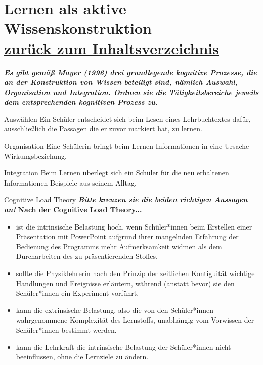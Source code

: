 \documentclass[a4paper]{article}
\newcommand{\ACorrectAnswer}{\rlap{$\square$}{\raisebox{2pt}{\large\hspace{1pt}\ding{51}}}\hspace{-2.5pt}}
\newcommand{\AWrongAnswer}{\rlap{$\square$}{\large\hspace{1pt}\ding{55}}}
\newcommand{\AnUnsureAnswer}{\rlap{$\square$}{\large\hspace{1pt}\textbf?}}
\newcommand{\defaultCorrect}{\ding{51}}
\newcommand{\defaultWrong}{\ding{55}}
\newcommand{\defaultUnsure}{\textbf{?}}
\newenvironment{answers}{\begin{itemize}}{\end{itemize}}
\newcommand{\correct}{\defaultCorrect}
\newcommand{\wrong}{\defaultWrong}
\newcommand{\unsure}{\defaultUnsure}
\newenvironment{question}[2]{%
    \section[#1 \normalfont(#2)]{#1\\\small\normalfont\hyperlink{tableofcontents}{zurück zum Inhaltsverzeichnis}}%
}{%
    \newpage%
}
\newcommand{\questiontext}[1]{\textbf{#1}}
\newcommand{\assignment}[1]{\textbf{\textit{#1}}\newline}
\newenvironment{multiple-choice}[1]{%
    \begin{question}{#1}{Multiple Choice}%
    \renewenvironment{answers}{%
        \begin{multiple-choice-list}}{\end{multiple-choice-list}%
    }%
    \renewcommand{\correct}{\ACorrectAnswer}%
    \renewcommand{\wrong}{\AWrongAnswer}%
    \renewcommand{\unsure}{\AnUnsureAnswer}%
}%
{%
    \renewcommand{\correct}{\defaultCorrect}%
    \renewcommand{\wrong}{\defaultWrong}%
    \renewcommand{\unsure}{\defaultUnsure}%
    \end{question}%
}
\newenvironment{mapping}[1]{%
    \begin{question}{#1}{Zuordnungsaufgabe}%
    \newcommand{\ismappedto}{\tcblower}%
    \newenvironment{answer}{\begin{mapping-box}}{\end{mapping-box}}%
}{%
    \end{question}%
}
\begin{document}
\begin{mapping}{Lernen als aktive Wissenskonstruktion}
    \assignment{Es gibt gemäß Mayer (1996) drei grundlegende kognitive Prozesse, die an der Konstruktion von Wissen beteiligt sind, nämlich Auswahl, Organisation und Integration. Ordnen sie die Tätigkeitsbereiche jeweils dem entsprechenden kognitiven Prozess zu.}
    \begin{answer}
        Auswählen
        \ismappedto
        Ein Schüler entscheidet sich beim Lesen eines Lehrbuchtextes dafür, ausschließlich die Passagen die er zuvor markiert hat, zu lernen.
    \end{answer}
    \begin{answer}
        Organisation
        \ismappedto
        Eine Schülerin bringt beim Lernen Informationen in eine Ursache-Wirkungsbeziehung.
    \end{answer}
    \begin{answer}
        Integration
        \ismappedto
        Beim Lernen überlegt sich ein Schüler für die neu erhaltenen Informationen Beispiele aus seinem Alltag.
    \end{answer}
\end{mapping}

\begin{multiple-choice}{Cognitive Load Theory}
    \assignment{Bitte kreuzen sie die beiden richtigen Aussagen an!}
    \questiontext{Nach der Cognitive Load Theory...}
    \begin{answers}
        \item[\correct] ist die intrinsische Belastung hoch, wenn Schüler*innen beim Erstellen einer Präsentation mit PowerPoint aufgrund ihrer mangelnden Erfahrung der Bedienung des Programms mehr Aufmerksamkeit widmen als dem Durcharbeiten des zu präsentierenden Stoffes.
        \item[\correct] sollte die Physiklehrerin nach den Prinzip der zeitlichen Kontiguität wichtige Handlungen und Ereignisse erläutern, \underline{während} (anstatt bevor) sie den Schüler*innen ein Experiment vorführt.
        \item[\wrong] kann die extrinsische Belastung, also die von den Schüler*innen wahrgenommene Komplexität des Lernstoffs, unabhängig vom Vorwissen der Schüler*innen bestimmt werden.
        \item[\wrong] kann die Lehrkraft die intrinsische Belastung der Schüler*innen nicht beeinflussen, ohne die Lernziele zu ändern.
    \end{answers}
\end{multiple-choice}
\end{document}
